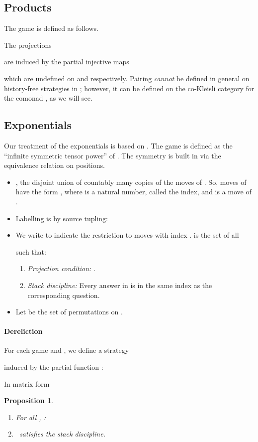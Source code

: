 \documentclass[11pt]{article}
\newtheorem{proposition}[theorem]{Proposition}
\begin{document}
\subsection{Products}
The game  is defined as follows.

The projections

are induced by the partial injective maps


which are undefined on  and  respectively.
Pairing {\sl cannot} be defined in general on history-free strategies in
;
however, it can be defined on the co-Kleisli category for the
comonad , as we will see.

\subsection{Exponentials}
Our treatment of the exponentials is based on \cite{AbramskyS:gamexp}.
The game  is defined as the ``infinite symmetric tensor power''
of .
The symmetry is built in via the equivalence relation on positions.

\begin{itemize}
\item , the
  disjoint union of countably many copies of the moves of .  So, moves
  of  have the form , where  is a natural
  number, called the index, and  is a move of .
\item Labelling is by source tupling:

\item We write  to indicate the restriction to moves with
  index .   is the set of all
  
such that:
\begin{enumerate}
\item {\em Projection condition:} .
\item {\em Stack discipline:} Every answer in  is in the same index as the
corresponding question.
\end{enumerate}
\item Let  be the set of permutations on .


\end{itemize}

\paragraph{Dereliction}
For each game  and , we define a strategy

induced by the partial function :

In matrix form


\begin{proposition}
\begin{enumerate}
\item For all , :

\item \,  satisfies the stack discipline.
\end{enumerate}
\end{proposition}
\end{document}
